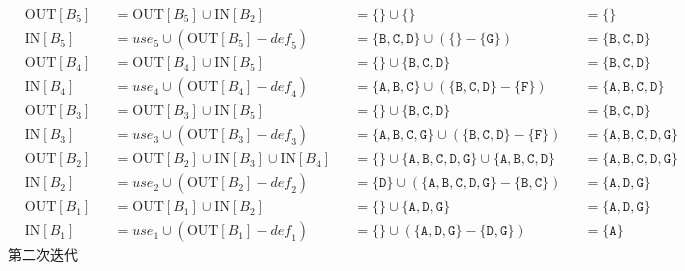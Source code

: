 \documentclass{article}
\begin{document}
\begin{align*}
    & \text{OUT}[B_5] &&= \text{OUT}[B_5] \cup \text{IN}[B_2]    &&= \{  \} \cup \{  \} &&= \{  \} \\
    & \text{IN}[B_5]  &&= \textit{use}_5 \cup ( \text{OUT}[B_5] - \textit{def}_5 ) &&= \{\texttt{B},\texttt{C},\texttt{D}\} \cup ( \{  \} - \{\texttt{G}\} ) &&= \{\texttt{B},\texttt{C},\texttt{D}\} \\
    & \text{OUT}[B_4] &&= \text{OUT}[B_4] \cup \text{IN}[B_5]    &&= \{  \} \cup \{\texttt{B},\texttt{C},\texttt{D}\} &&= \{\texttt{B},\texttt{C},\texttt{D}\} \\
    & \text{IN}[B_4]  &&= \textit{use}_4 \cup ( \text{OUT}[B_4] - \textit{def}_4 ) &&= \{\texttt{A},\texttt{B},\texttt{C}\} \cup ( \{\texttt{B},\texttt{C},\texttt{D}\} - \{\texttt{F}\} ) &&= \{\texttt{A},\texttt{B},\texttt{C},\texttt{D}\} \\
    & \text{OUT}[B_3] &&= \text{OUT}[B_3] \cup \text{IN}[B_5]    &&= \{  \} \cup \{\texttt{B},\texttt{C},\texttt{D}\} &&= \{\texttt{B},\texttt{C},\texttt{D}\} \\
    & \text{IN}[B_3]  &&= \textit{use}_3 \cup ( \text{OUT}[B_3] - \textit{def}_3 ) &&= \{\texttt{A},\texttt{B},\texttt{C},\texttt{G}\} \cup ( \{\texttt{B},\texttt{C},\texttt{D}\} - \{\texttt{F}\} ) &&= \{\texttt{A},\texttt{B},\texttt{C},\texttt{D},\texttt{G}\} \\
    & \text{OUT}[B_2] &&= \text{OUT}[B_2] \cup \text{IN}[B_3] \cup \text{IN}[B_4]    &&= \{  \} \cup \{\texttt{A},\texttt{B},\texttt{C},\texttt{D},\texttt{G}\} \cup \{\texttt{A},\texttt{B},\texttt{C},\texttt{D}\} &&= \{\texttt{A},\texttt{B},\texttt{C},\texttt{D},\texttt{G}\} \\
    & \text{IN}[B_2]  &&= \textit{use}_2 \cup ( \text{OUT}[B_2] - \textit{def}_2 ) &&= \{\texttt{D}\} \cup ( \{\texttt{A},\texttt{B},\texttt{C},\texttt{D},\texttt{G}\} - \{\texttt{B},\texttt{C}\} ) &&= \{\texttt{A},\texttt{D},\texttt{G}\} \\
    & \text{OUT}[B_1] &&= \text{OUT}[B_1] \cup \text{IN}[B_2]    &&= \{  \} \cup \{\texttt{A},\texttt{D},\texttt{G}\} &&= \{\texttt{A},\texttt{D},\texttt{G}\} \\
    & \text{IN}[B_1]  &&= \textit{use}_1 \cup ( \text{OUT}[B_1] - \textit{def}_1 ) &&= \{  \} \cup ( \{\texttt{A},\texttt{D},\texttt{G}\} - \{\texttt{D},\texttt{G}\} ) &&= \{ \texttt{A} \}
\end{align*}
第二次迭代
\end{document}
